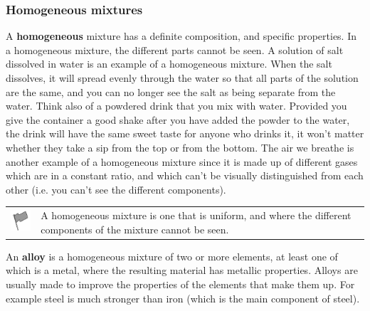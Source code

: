             \subsubsection{ Homogeneous mixtures}
            \nopagebreak
        \label{m38708*id62762}A \textbf{homogeneous} mixture has a definite composition, and specific properties. In a homogeneous mixture, the different parts cannot be seen. A solution of salt dissolved in water is an example of a homogeneous mixture. When the salt dissolves, it will spread evenly through the water so that all parts of the solution are the same, and you can no longer see the salt as being separate from the water. Think also of a powdered drink that you mix with water. Provided you give the container a good shake after you have added the powder to the water, the drink will have the same sweet taste for anyone who drinks it, it won't matter whether they take a sip from the top or from the bottom. The air we breathe is another example of a homogeneous mixture since it is made up of different gases which are in a constant ratio, and which can't be visually distinguished from each other (i.e. you can't see the different components).\par 
\label{m38708*fhsst!!!underscore!!!id96}\begin{definition}
	  \begin{tabular*}{15 cm}{m{15 mm}m{}}
	\hspace*{-50pt}  \includegraphics[width=0.5in]{col11305.imgs/psflag2.png}   & \Definition{   \label{id2405912}\textbf{ Homogeneous mixture }} { \label{m38708*meaningfhsst!!!underscore!!!id96}
        A homogeneous mixture is one that is uniform, and where the different components of the mixture cannot be seen. 
         } 
      \end{tabular*}
      \end{definition}
        \label{m38708*id62795}An \textbf{alloy} is a homogeneous mixture of two or more elements, at least one of which is a metal, where the resulting material has metallic properties. Alloys are usually made to improve the properties of the elements that make them up. For example steel is much stronger than iron (which is the main component of steel).\par 
\label{m38708*eip-479}\vspace{.5cm} 
      \noindent
